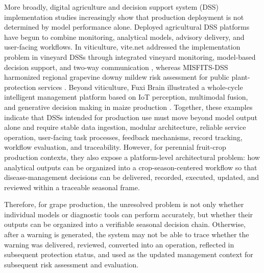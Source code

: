 \documentclass[12pt]{article}
\begin{document}
More broadly, digital agriculture and decision support system (DSS) implementation studies increasingly show that production deployment is not determined by model performance alone. Deployed agricultural DSS platforms have begun to combine monitoring, analytical models, advisory delivery, and user-facing workflows. In viticulture, vite.net addressed the implementation problem in vineyard DSSs through integrated vineyard monitoring, model-based decision support, and two-way communication \citep{rossiAddressingImplementationProblem2014}, whereas MISFITS-DSS harmonized regional grapevine downy mildew risk assessment for public plant-protection services \citep{bregaglioPublicDecisionSupport2022}. Beyond viticulture, Fuxi Brain illustrated a whole-cycle intelligent management platform based on IoT perception, multimodal fusion, and generative decision making in maize production \citep{chenAgriculturalAutonomousDecisionmaking2026}. Together, these examples indicate that DSSs intended for production use must move beyond model output alone and require stable data ingestion, modular architecture, reliable service operation, user-facing task processes, feedback mechanisms, record tracking, workflow evaluation, and traceability. However, for perennial fruit-crop production contexts, they also expose a platform-level architectural problem: how analytical outputs can be organized into a crop-season-centered workflow so that disease-management decisions can be delivered, recorded, executed, updated, and reviewed within a traceable seasonal frame.

Therefore, for grape production, the unresolved problem is not only whether individual models or diagnostic tools can perform accurately, but whether their outputs can be organized into a verifiable seasonal decision chain. Otherwise, after a warning is generated, the system may not be able to trace whether the warning was delivered, reviewed, converted into an operation, reflected in subsequent protection status, and used as the updated management context for subsequent risk assessment and evaluation.
\end{document}
